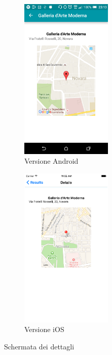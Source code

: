 \begin{figure}[ht]
	\begin{subfigure}{0.5\textwidth}
		\centering
		\includegraphics[width=0.48\textwidth]{6-implementazione-app/immagini/details_android.png}
		\caption{Versione Android}
	\end{subfigure}
	\begin{subfigure}{0.5\textwidth}
		\centering
		\includegraphics[width=0.48\textwidth]{6-implementazione-app/immagini/details_ios.pdf}
		\caption{Versione iOS}
	\end{subfigure}	
	\caption{Schermata dei dettagli}
	\label{fig:schermate-app-mashup}
\end{figure}

